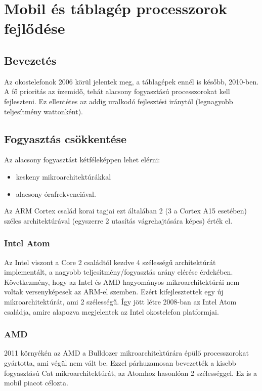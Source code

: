 
\chapter{Mobil és táblagép processzorok fejlődése}

\section{Bevezetés}
Az okostelefonok 2006 körül jelentek meg, a táblagépek ennél is később, 2010-ben.
A fő prioritás az üzemidő, tehát alacsony fogyasztású processzorokat kell fejleszteni.
Ez ellentétes az addig uralkodó fejlesztési iránytól (legnagyobb teljesítmény wattonként).

\section{Fogyasztás csökkentése}
Az alacsony fogyasztást kétféleképpen lehet elérni:
\begin{itemize}
    \item keskeny mikroarchitektúrákkal
    \item alacsony órafrekvenciával.
\end{itemize}

Az ARM Cortex család korai tagjai ezt általában 2 (3 a Cortex A15 esetében) széles architektúrával (egyszerre 2 utasítás vágrehajtására képes) érték el.

\subsection{Intel Atom}
Az Intel viszont a Core 2 családtól kezdve 4 szélességű architektúrát implementált, a nagyobb teljesítmény/fogyasztás arány elérése érdekében.
Következmény, hogy az Intel és AMD hagyományos mikroarchitektúrái nem voltak versenyképesek az ARM-el szemben.
Ezért kifejlesztettek egy új mikroarchitektúrát, ami 2 szélességű.
Így jött létre 2008-ban az Intel Atom családja, amire alapozva megjelentek az Intel okostelefon platformjai.

\subsection{AMD}
2011 környékén az AMD a Bulldozer mikroarchitektúrára épülő processzorokat gyártotta, ami végül nem vált be.
Ezzel párhuzamosan bevezették a kisebb fogyasztású Cat mikroarchitektúrát, az Atomhoz hasonlóan 2 szélességgel.
Ez is a mobil piacot célozta.

